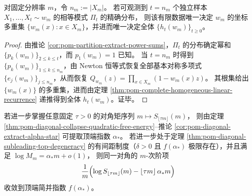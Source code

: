 \begin{theorem}[闭环 1：有限样本相等模式 \texorpdfstring{$\Rightarrow$}{=>} 全恢复曲线]\label{thm:pom-closure-partition-to-full-recovery-curve}
对固定分辨率 \(m\)，令 \(n_m:=|X_m|\)。
若可观测到 \(t=n_m\) 个独立样本 \(X_1,\dots,X_t\sim w_m\) 的相等模式 \(\Pi_t\) 的精确分布，
则该有限数据唯一决定 \(w_m\) 的坐标多重集 \(\{w_m(x):x\in X_m\}\)，并进而唯一决定全体 \(\{h_t(w_m)\}_{t\ge0}\)。
\end{theorem}
\begin{proof}
由推论 \ref{cor:pom-partition-extract-power-sums}，\(\Pi_t\) 的分布确定幂和 \(\{p_k(w_m)\}_{2\le k\le t}\)，而 \(p_1(w_m)=1\) 已知。
当 \(t=n_m\) 时得到 \(\{p_k(w_m)\}_{1\le k\le n_m}\)，由 Newton 恒等式恢复全部基本对称多项式 \(\{e_j(w_m)\}_{j\le n_m}\)，从而恢复 \(Q_{w_m}(z)=\prod_{x\in X_m}(1-w_m(x)z)\)。
其根集给出 \(\{w_m(x)\}\) 的多重集，进而由定理 \ref{thm:pom-complete-homogeneous-linear-recurrence} 递推得到全体 \(h_t(w_m)\)。证毕。
\end{proof}

\begin{theorem}[闭环 2：对角矩 \texorpdfstring{$\Rightarrow$}{=>} 顶端谱]\label{thm:pom-closure-diagonal-to-top-spectrum}
若进一步掌握任意固定 \(\tau>0\) 的对角矩序列 \(m\mapsto S_{\lfloor\tau m\rfloor}(m)\)，
则由定理 \ref{thm:pom-diagonal-collapse-quadratic-free-energy}--推论 \ref{cor:pom-diagonal-extract-alpha-star} 可提取顶端指数 \(\alpha_\ast\)。
若进一步处于定理 \ref{thm:pom-diagonal-subleading-top-degeneracy} 的有间距制度（\(\delta>0\) 且 \(f(\alpha_\ast)\) 极限存在），并且满足 \(\log M_m=\alpha_\ast m+o(1)\)，
则同一对角的 \(m\)-次阶项
\[
\frac{1}{m}\Bigl(\log S_{\lfloor\tau m\rfloor}(m)-\lfloor\tau m\rfloor\,\alpha_\ast m\Bigr)
\]
收敛到顶端简并指数 \(f(\alpha_\ast)\)。
\end{theorem}

